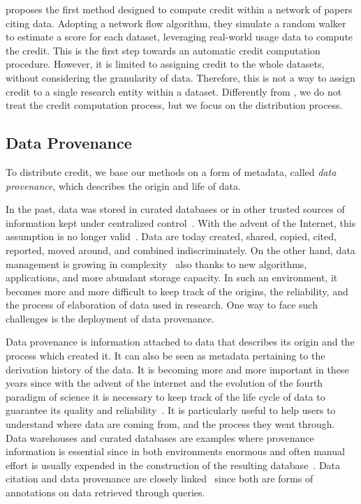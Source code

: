 \citep{zeng2020assigning} proposes the first method designed to compute credit within a network of papers citing data. 
Adopting a network flow algorithm, they simulate a random walker to estimate a score for each dataset, leveraging real-world usage data to compute the credit.
This is the first step towards an automatic credit computation procedure.
However, it is limited to assigning credit to the whole datasets, without considering the granularity of data. Therefore, this is not a way to assign credit to a single research entity within a dataset. 
Differently from \citep{zeng2020assigning}, we do not treat the credit computation process, but we focus on the distribution process.

\subsection{Data Provenance}
\label{section:related_provenance}

To distribute credit, we base our methods on a form of metadata, called \emph{data provenance}, which describes the origin and life of data. 

In the past, data was stored in curated databases or in other trusted sources of information kept under centralized control~\citep{CheneyProvSurvey}. 
With the advent of the Internet, this assumption is no longer valid~\citep{lynch2001documents}. Data are today created, shared, copied, cited, reported, moved around, and combined indiscriminately.
On the other hand, data management is growing in complexity~\citep{SimmhanPG05} also thanks to new algorithms, applications, and more abundant storage capacity.
In such an environment, it becomes more and more difficult to keep track of the origins, the reliability, and the process of elaboration of data used in research.
One way to face such challenges is the deployment of data provenance. 

Data provenance is information attached to data that describes its origin and the process which created it. It can also be seen as metadata pertaining to the derivation history of the data. 
It is becoming more and more important in these years since with the advent of the internet and the evolution of the fourth paradigm of science it is necessary to keep track of the life cycle of data to guarantee its quality and reliability~\citep{SimmhanPG05, CheneyProvSurvey}. 
 It is particularly useful to help users to understand where data are coming from, and the process they went through. 
 Data warehouses and curated databases are examples where provenance information is essential since in both environments enormous and often manual effort is usually expended in the construction of the resulting database~\citep{CheneyProvSurvey}. 
 Data citation and data provenance are closely linked~\citep{AlawiniDSTW17} since both are forms of annotations on data retrieved through queries. 

